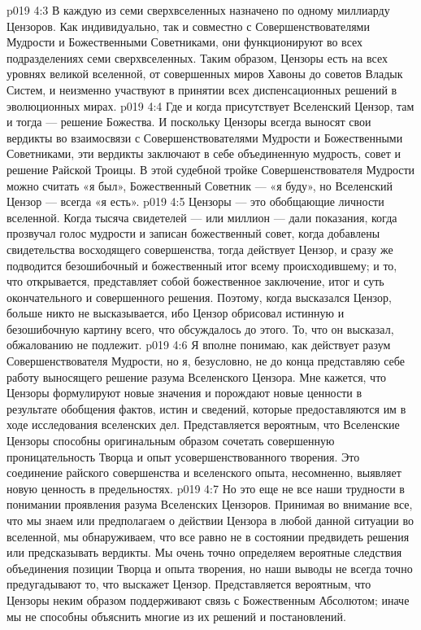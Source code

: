 \vs p019 4:3 В каждую из семи сверхвселенных назначено по одному миллиарду Цензоров. Как индивидуально, так и совместно с Совершенствователями Мудрости и Божественными Советниками, они функционируют во всех подразделениях семи сверхвселенных. Таким образом, Цензоры есть на всех уровнях великой вселенной, от совершенных миров Хавоны до советов Владык Систем, и неизменно участвуют в принятии всех диспенсационных решений в эволюционных мирах.
\vs p019 4:4 \pc Где и когда присутствует Вселенский Цензор, там и тогда --- решение Божества. И поскольку Цензоры всегда выносят свои вердикты во взаимосвязи с Совершенствователями Мудрости и Божественными Советниками, эти вердикты заключают в себе объединенную мудрость, совет и решение Райской Троицы. В этой судебной тройке Совершенствователя Мудрости можно считать «я был», Божественный Советник --- «я буду», но Вселенский Цензор --- всегда «я есть».
\vs p019 4:5 \pc Цензоры --- это обобщающие личности вселенной. Когда тысяча свидетелей --- или миллион --- дали показания, когда прозвучал голос мудрости и записан божественный совет, когда добавлены свидетельства восходящего совершенства, тогда действует Цензор, и сразу же подводится безошибочный и божественный итог всему происходившему; и то, что открывается, представляет собой божественное заключение, итог и суть окончательного и совершенного решения. Поэтому, когда высказался Цензор, больше никто не высказывается, ибо Цензор обрисовал истинную и безошибочную картину всего, что обсуждалось до этого. То, что он высказал, обжалованию не подлежит.
\vs p019 4:6 Я вполне понимаю, как действует разум Совершенствователя Мудрости, но я, безусловно, не до конца представляю себе работу выносящего решение разума Вселенского Цензора. Мне кажется, что Цензоры формулируют новые значения и порождают новые ценности в результате обобщения фактов, истин и сведений, которые предоставляются им в ходе исследования вселенских дел. Представляется вероятным, что Вселенские Цензоры способны оригинальным образом сочетать совершенную проницательность Творца и опыт усовершенствованного творения. Это соединение райского совершенства и вселенского опыта, несомненно, выявляет новую ценность в предельностях.
\vs p019 4:7 Но это еще не все наши трудности в понимании проявления разума Вселенских Цензоров. Принимая во внимание все, что мы знаем или предполагаем о действии Цензора в любой данной ситуации во вселенной, мы обнаруживаем, что все равно не в состоянии предвидеть решения или предсказывать вердикты. Мы очень точно определяем вероятные следствия объединения позиции Творца и опыта творения, но наши выводы не всегда точно предугадывают то, что выскажет Цензор. Представляется вероятным, что Цензоры неким образом поддерживают связь с Божественным Абсолютом; иначе мы не способны объяснить многие из их решений и постановлений.
